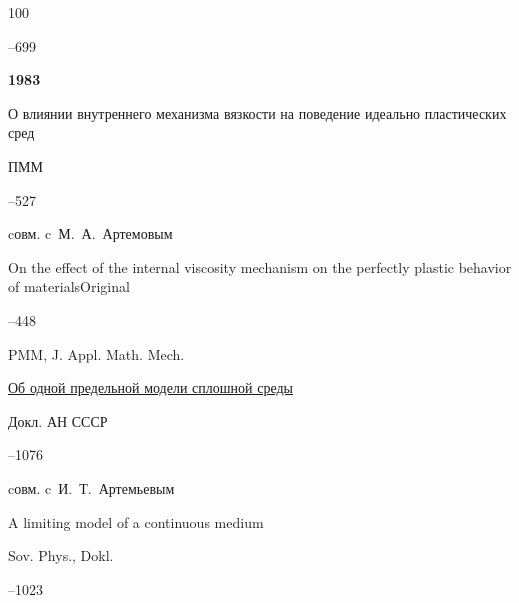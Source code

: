 \begin{thebibliography}{100}

--699 







\item[] \centerline{\bf 1983}




\paper О влиянии внутреннего механизма вязкости на поведение идеально пластических сред 

\jour ПММ 




–527 

\miscnote cовм. c~М.~А.~Артемовым

\transl

\paper On the effect of the internal viscosity mechanism on the perfectly plastic behavior of materialsOriginal 

--448

\jour PMM, J. Appl. Math. Mech. 









\paper \href{https://zbmath.org/?q=an:0629.76076}{Об одной предельной модели сплошной среды}

\jour Докл. АН СССР




–1076 

\miscnote cовм. c~И.~Т.~Артемьевым


\transl


\paper A limiting model of a continuous medium

\jour Sov. Phys., Dokl. 


--1023 


\end{thebibliography}
